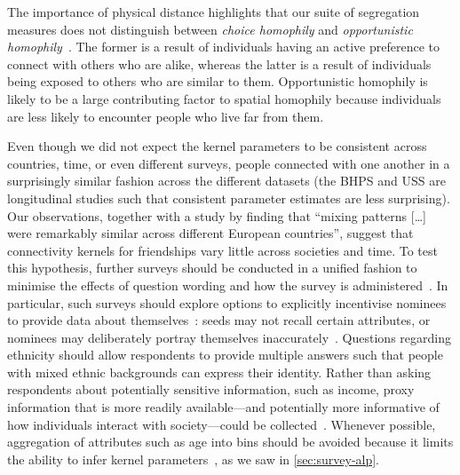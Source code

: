 \documentclass{scrartcl}
\begin{document}
The importance of physical distance highlights that our suite of segregation measures does not distinguish between \emph{choice homophily} and \emph{opportunistic homophily}~\cite{Franz2010}. The former is a result of individuals having an active preference to connect with others who are alike, whereas the latter is a result of individuals being exposed to others who are similar to them. %
Opportunistic homophily is likely to be a large contributing factor to spatial homophily because individuals are less likely to encounter people who live far from them.

Even though we did not expect the kernel parameters to be consistent across countries, time, or even different surveys, people connected with one another in a surprisingly similar fashion across the different datasets (the BHPS and USS are longitudinal studies such that consistent parameter estimates are less surprising). Our observations, together with a study by \textcite{Mossong2008} finding that ``mixing patterns [\ldots] were remarkably similar across different European countries'', suggest that connectivity kernels for friendships vary little across societies and time. To test this hypothesis, further surveys should be conducted in a unified fashion to minimise the effects of question wording and how the survey is administered~\cite{Eagle2015}. In particular, such surveys should explore options to explicitly incentivise nominees to provide data about themselves~\cite{Biernacki1981}: seeds may not recall certain attributes, or nominees may deliberately portray themselves inaccurately~\cite{Bruch2016}. Questions regarding ethnicity should allow respondents to provide multiple answers such that people with mixed ethnic backgrounds can express their identity. Rather than asking respondents about potentially sensitive information, such as income, proxy information that is more readily available---and potentially more informative of how individuals interact with society---could be collected~\cite{Po2012}. Whenever possible, aggregation of attributes such as age into bins should be avoided because it limits the ability to infer kernel parameters~\cite{Hutcheon2010}, as we saw in \cref{sec:survey-alp}.

\end{document}
